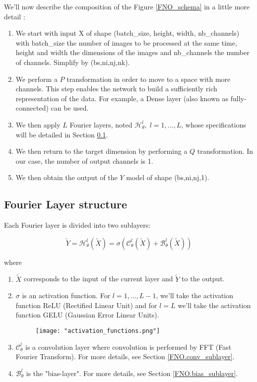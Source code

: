 We'll now describe the composition of the Figure \ref{FNO_schema} in a little more detail :
\begin{enumerate}[label=\textbullet]
	\item We start with input X of shape (batch\_size, height, width, nb\_channels) with batch\_size the number of images to be processed at the same time, height and width the dimensions of the images and nb\_channels the number of channels. Simplify by (bs,ni,nj,nk).
	\item We perform a $P$ transformation in order to move to a space with more channels. This step enables the network to build a sufficiently rich representation of the data.  For example, a Dense layer (also known as fully-connected) can be used. 	
	\item We then apply $L$ Fourier layers, noted $\mathcal{H}_\theta^l,\; l=1,\dots,L$, whose specifications will be detailed in Section \ref{FNO.fourierlayer}.
	\item We then return to the target dimension by performing a $Q$ transformation. In our case, the number of output channels is 1.
	\item We then obtain the output of the $Y$ model of shape (bs,ni,nj,1). 
\end{enumerate}

\subsection{Fourier Layer structure} \label{FNO.fourierlayer}

Each Fourier layer is divided into two sublayers:

\begin{equation*}
	\tilde{Y}=\mathcal{H}_\theta^l(\tilde{X})=\sigma\left(\mathcal{C}_\theta^l(\tilde{X})+\mathcal{B}_\theta^l(\tilde{X})\right)
\end{equation*}

where
\begin{enumerate}[label=\textbullet]
	\item $\tilde{X}$ corresponds to the input of the current layer and $\tilde{Y}$ to the output.
	\item $\sigma$ is an activation function. For $l=1,\dots,L-1$, we'll take the activation function ReLU (Rectified Linear Unit) and for $l=L$ we'll take the activation function GELU (Gaussian Error Linear Units).
	\begin{figure}[H]
		\centering
		\texttt{[image: "activation\_functions.png"]}
	\end{figure}
	
	\item $\mathcal{C}_\theta^l$ is a convolution layer where convolution is performed by FFT (Fast Fourier Transform). For more details, see Section \ref{FNO.conv_sublayer}.
	\item $\mathcal{B}_\theta^l$ is the "bias-layer". For more details, see Section \ref{FNO.bias_sublayer}.
\end{enumerate}

